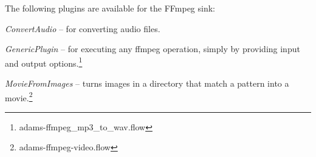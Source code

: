 \documentclass[a4paper]{book}
\begin{document}
\noindent The following plugins are available for the FFmpeg sink:
\begin{tight_itemize}
  \item \textit{ConvertAudio} -- for converting audio files.
  \item \textit{GenericPlugin} -- for executing any ffmpeg operation, simply
  by providing input and output options.\footnote{adams-ffmpeg\_mp3\_to\_wav.flow}
  \item \textit{MovieFromImages} -- turns images in a directory that match a
  pattern into a movie.\footnote{adams-ffmpeg-video.flow}
\end{tight_itemize}



\end{document}
